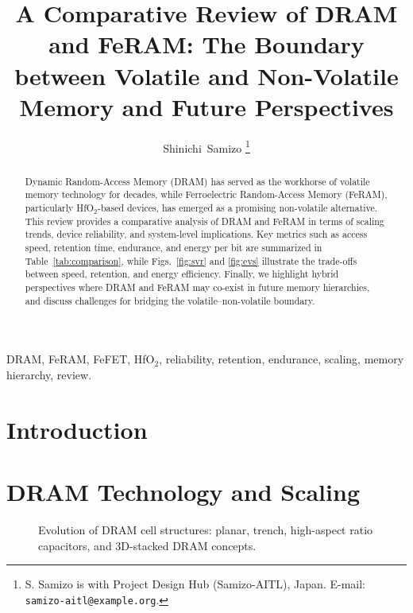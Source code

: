 \documentclass[journal]{IEEEtran}
\title{A Comparative Review of DRAM and FeRAM: The Boundary between Volatile and Non-Volatile Memory and Future Perspectives}
\author{Shinichi~Samizo%
\thanks{S. Samizo is with Project Design Hub (Samizo-AITL), Japan. E-mail: \texttt{samizo-aitl@example.org}.}
}
\begin{document}
\maketitle

\begin{abstract}
Dynamic Random-Access Memory (DRAM) has served as the workhorse of volatile memory technology for decades, while Ferroelectric Random-Access Memory (FeRAM), particularly HfO$_2$-based devices, has emerged as a promising non-volatile alternative. This review provides a comparative analysis of DRAM and FeRAM in terms of scaling trends, device reliability, and system-level implications. Key metrics such as access speed, retention time, endurance, and energy per bit are summarized in Table~\ref{tab:comparison}, while Figs.~\ref{fig:svr} and \ref{fig:evs} illustrate the trade-offs between speed, retention, and energy efficiency. Finally, we highlight hybrid perspectives where DRAM and FeRAM may co-exist in future memory hierarchies, and discuss challenges for bridging the volatile--non-volatile boundary.
\end{abstract}

\begin{IEEEkeywords}
DRAM, FeRAM, FeFET, HfO$_2$, reliability, retention, endurance, scaling, memory hierarchy, review.
\end{IEEEkeywords}

\section{Introduction}


\section{DRAM Technology and Scaling}


\begin{figure}[!t]
\centering
{}
\caption{Evolution of DRAM cell structures: planar, trench, high-aspect ratio capacitors, and 3D-stacked DRAM concepts.}
\label{fig:dram_evolution}
\end{figure}
\end{document}

